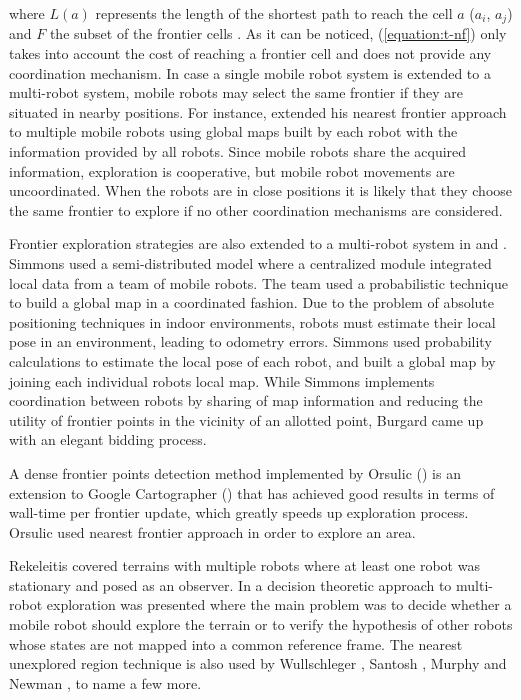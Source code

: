 where $L(a)$ represents the length of the shortest path to reach the cell $a$ ($a_{i}$, $a_{j}$) and $F$ the subset of the frontier cells \cite{Julia2012}. As it can be noticed, (\ref{equation:t-nf}) only takes into account the cost of reaching a frontier cell and does not provide any coordination mechanism. In case a single mobile robot system is extended to a multi-robot system, mobile robots may select the same frontier if they are situated in nearby positions. For instance, \cite{Yamauchi1998} extended his nearest frontier approach to multiple mobile robots using global maps built by each robot with the information provided by all robots. Since mobile robots share the acquired information, exploration is cooperative, but mobile robot movements are uncoordinated. When the robots are in close positions it is likely that they choose the same frontier to explore if no other coordination mechanisms are considered.

Frontier exploration strategies are also extended to a multi-robot system in \cite{Simmons2000} and \cite{Burgard2005}. Simmons \cite{Simmons2000} used a semi-distributed model where a centralized module integrated local data from a team of mobile robots. The team used a probabilistic technique to build a global map in a coordinated fashion. Due to the problem of absolute positioning techniques in indoor environments, robots must estimate their local pose in an environment, leading to odometry errors. Simmons used probability calculations to estimate the local pose of each robot, and built a global map by joining each individual robots local map. 
While Simmons \cite{Simmons2000} implements coordination between robots by sharing of map information and reducing the utility of frontier points in the vicinity of an allotted point, Burgard \cite{Burgard2005} came up with an elegant bidding process. 

A dense frontier points detection method implemented by Orsulic (\cite{Orsulic2019}) is an extension to Google Cartographer (\cite{Hess2016}) that has achieved good results in terms of wall-time per frontier update, which greatly speeds up exploration process. Orsulic used nearest frontier approach in order to explore an area. 

Rekeleitis \cite{Rekeleitis2000} covered terrains with multiple robots where at least one robot was stationary and posed as an observer. In \cite{Fox2006} a decision theoretic approach to multi-robot exploration was presented where the main problem was to decide whether a mobile robot should explore the terrain or to verify the hypothesis of other robots whose states are not mapped into a common reference frame. The nearest unexplored region technique is also used by Wullschleger \cite{Wullschleger99}, Santosh \cite{Santosh2008}, Murphy and Newman \cite{Murphy2008}, to name a few more.


